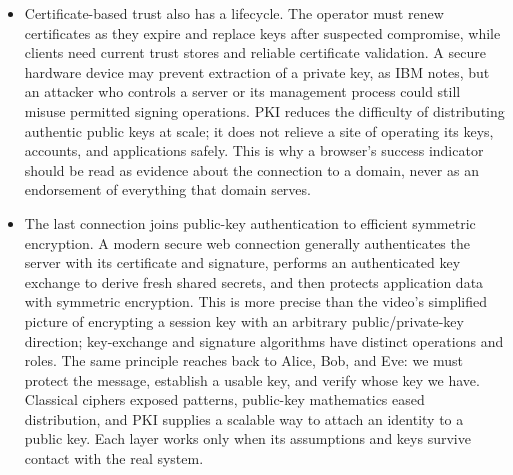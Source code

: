 \documentclass[10pt]{article}
\begin{document}
\begin{itemize}[leftmargin=1.25em, itemsep=0.3em, parsep=0pt, topsep=0pt]
    \item Certificate-based trust also has a lifecycle. The operator must renew certificates as they expire and replace keys after suspected compromise, while clients need current trust stores and reliable certificate validation. A secure hardware device may prevent extraction of a private key, as IBM notes, but an attacker who controls a server or its management process could still misuse permitted signing operations. PKI reduces the difficulty of distributing authentic public keys at scale; it does not relieve a site of operating its keys, accounts, and applications safely. This is why a browser's success indicator should be read as evidence about the connection to a domain, never as an endorsement of everything that domain serves.

    \item The last connection joins public-key authentication to efficient symmetric encryption. A modern secure web connection generally authenticates the server with its certificate and signature, performs an authenticated key exchange to derive fresh shared secrets, and then protects application data with symmetric encryption. This is more precise than the video's simplified picture of encrypting a session key with an arbitrary public/private-key direction; key-exchange and signature algorithms have distinct operations and roles. The same principle reaches back to Alice, Bob, and Eve: we must protect the message, establish a usable key, and verify whose key we have. Classical ciphers exposed patterns, public-key mathematics eased distribution, and PKI supplies a scalable way to attach an identity to a public key. Each layer works only when its assumptions and keys survive contact with the real system.
\end{itemize}

\end{document}
